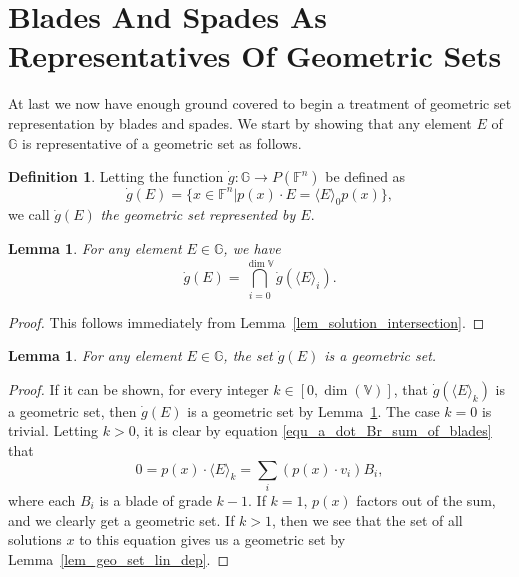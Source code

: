 \documentclass{birkjour}
\newtheorem{lem}[thm]{Lemma}
\theoremstyle{definition}
\newtheorem{defn}[thm]{Definition}
\theoremstyle{remark}
\numberwithin{equation}{section}
\newcommand{\F}{\mathbb{F}}
\newcommand{\G}{\mathbb{G}}
\newcommand{\V}{\mathbb{V}}
\newcommand{\gd}{\dot{g}}
\begin{document}
\section{Blades And Spades As Representatives Of Geometric Sets}

At last we now have enough ground covered to begin a treatment of geometric set representation by blades and spades.
We start by showing that any element $E$ of $\G$ is representative of a geometric set as follows.

\begin{defn}
Letting the function $\gd:\G\to P(\F^n)$ be defined as
\begin{equation*}
\gd(E) = \{x\in\F^n|p(x)\cdot E=\langle E\rangle_0p(x)\},
\end{equation*}
we call $\gd(E)$ \emph{the geometric set represented by $E$}.
\end{defn}

\begin{lem}\label{lem_intersect_grade_parts}
For any element $E\in\G$, we have
\begin{equation*}
\gd(E) = \bigcap_{i=0}^{\dim\V}\gd(\langle E\rangle_i).
\end{equation*}
\end{lem}
\begin{proof}
This follows immediately from Lemma~\ref{lem_solution_intersection}.
\end{proof}

\begin{lem}
For any element $E\in\G$, the set $\gd(E)$ is a geometric set.
\end{lem}
\begin{proof}
If it can be shown, for every integer $k\in[0,\dim(\V)]$, that $\gd(\langle E\rangle_k)$ is a geometric set,
then $\gd(E)$ is a geometric set by Lemma~\ref{lem_intersect_grade_parts}.
The case $k=0$ is trivial.  Letting $k>0$, it is clear by equation \eqref{equ_a_dot_Br_sum_of_blades} that
\begin{equation*}
0 = p(x)\cdot\langle E\rangle_k = \sum_i (p(x)\cdot v_i)B_i,
\end{equation*}
where each $B_i$ is a blade of grade $k-1$.  If $k=1$, $p(x)$ factors out of the sum, and we clearly get a geometric
set.  If $k>1$, then we see that the set of all solutions $x$
to this equation gives us a geometric set by Lemma~\ref{lem_geo_set_lin_dep}.
\end{proof}
\end{document}

